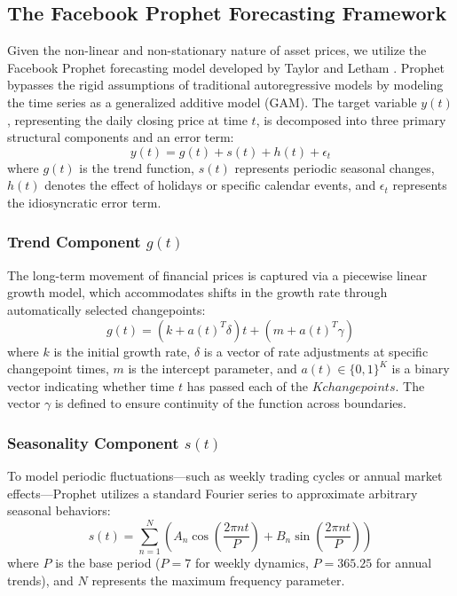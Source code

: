\documentclass[11pt,twoside]{article}
\begin{document}
\subsection{The Facebook Prophet Forecasting Framework}
\label{SubSec:Prophet}

Given the non-linear and non-stationary nature of asset prices, we utilize the Facebook Prophet forecasting model developed by Taylor and Letham \cite{Taylor2018}. Prophet bypasses the rigid assumptions of traditional autoregressive models by modeling the time series as a generalized additive model (GAM). The target variable $y(t)$, representing the daily closing price at time $t$, is decomposed into three primary structural components and an error term:
\begin{equation}
y(t) = g(t) + s(t) + h(t) + \epsilon_t
\end{equation}
where $g(t)$ is the trend function, $s(t)$ represents periodic seasonal changes, $h(t)$ denotes the effect of holidays or specific calendar events, and $\epsilon_t$ represents the idiosyncratic error term.

\subsubsection{Trend Component $g(t)$}
The long-term movement of financial prices is captured via a piecewise linear growth model, which accommodates shifts in the growth rate through automatically selected changepoints:
\begin{equation}
g(t) = (k + a(t)^T \delta) t + (m + a(t)^T \gamma)
\end{equation}
where $k$ is the initial growth rate, $\delta$ is a vector of rate adjustments at specific changepoint times, $m$ is the intercept parameter, and $a(t) \in \{0,1\}^K$ is a binary vector indicating whether time $t$ has passed each of the $K changepoints$. The vector $\gamma$ is defined to ensure continuity of the function across boundaries.

\subsubsection{Seasonality Component $s(t)$}
To model periodic fluctuations—such as weekly trading cycles or annual market effects—Prophet utilizes a standard Fourier series to approximate arbitrary seasonal behaviors:
\begin{equation}
s(t) = \sum_{n=1}^{N} \left( A_n \cos\left(\frac{2\pi n t}{P}\right) + B_n \sin\left(\frac{2\pi n t}{P}\right) \right)
\end{equation}
where $P$ is the base period ($P = 7$ for weekly dynamics, $P = 365.25$ for annual trends), and $N$ represents the maximum frequency parameter.
\end{document}
